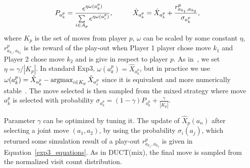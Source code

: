 \documentclass{article}
\newcommand{\argmax}{\operatornamewithlimits{argmax}}
\begin{document}
\begin{equation}\label{exp3_equations}
P_{a^{p}_{k}}=\frac{e^{\eta\omega(a^{p}_{k})}}{\sum\limits_{i \in A_{p}}e^{\eta\omega(a^{p}_{i})}}, 
\mbox{\hspace{1cm}}
\hat{X}_{a^{p}_{k}} = \hat{X}_{a^{p}_{k}} + \frac{r^{p}_{a_{k_{1}},a_{k_{2}}}}{\sigma_{a^{p}_{k}}},
\end{equation}
where $K_{p}$ is the set of moves from player $p$, $\omega$ can be scaled by some constant $\eta$, $r^{p}_{a_{k_{1}},a_{k_{2}}}$ is the reward of the play-out when Player 1 player chose move $k_{1}$ and Player 2 chose move $k_{2}$ and is give in respect to player $p$.
As in~\cite{mcts_goofspiel}, we set $\eta = \gamma / |K_p|$. 
In standard Exp3, $\omega(a^p_k) = \hat{X}_{a^p_k}$, but in practice we use $\omega(a^{p}_{k} ) = \hat{X}_{a^{p}_{k}} - \argmax_{i \in K_{p}}\hat{X}_{a^{p}_{i}}$ since it is equivalent and more numerically stable~\cite{mcts_goofspiel}.
The move selected is then sampled from the mixed strategy where move $a^p_k$ is selected with probability $\sigma_{a^{p}_{k}}=(1-\gamma)  P_{a^{p}_{k}} + \frac{\gamma}{|K_{p}|}$.




Parameter $\gamma$ can be optimized by tuning it. The update of $\hat{X}_{p}(a_{n})$ after selecting a joint move $(a_{1},a_{2})$, by using the probability $\sigma_{i}(a_{j})$, which returned some simulation result of a play-out $r^{p}_{a_{k_{1}},a_{k_{2}}}$ is given in Equation~\ref{exp3_equations}.
As in DUCT(mix), the final move is sampled from the normalized visit count distribution.
\end{document}
